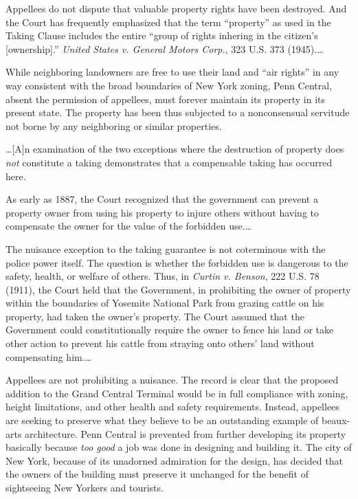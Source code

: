
Appellees do not dispute that valuable property rights have been destroyed. And
the Court has frequently emphasized that the term ``property'' as used in the
Taking Clause includes the entire ``group of rights inhering in the citizen's
[ownership].'' \textit{United States v. General Motors Corp.}, 323 U.S. 373
(1945).\ldots

While neighboring landowners are free to use their land and ``air rights'' in
any way consistent with the broad boundaries of New York zoning, Penn Central,
absent the permission of appellees, must forever maintain its property in its
present state. The property has been thus subjected to a nonconsensual servitude
not borne by any neighboring or similar properties.



\ldots [A]n examination of the two exceptions where the destruction of property
does \textit{not} constitute a taking demonstrates that a compensable taking has
occurred here.



As early as 1887, the Court recognized that the government can prevent a
property owner from using his property to injure others without having to
compensate the owner for the value of the forbidden use.\ldots

The nuisance exception to the taking guarantee is not coterminous with the
police power itself. The question is whether the forbidden use is dangerous to
the safety, health, or welfare of others. Thus, in \textit{Curtin v. Benson},
222 U.S. 78 (1911), the Court held that the Government, in prohibiting the owner
of property within the boundaries of Yosemite National Park from grazing cattle
on his property, had taken the owner's property. The Court assumed that the
Government could constitutionally require the owner to fence his land or take
other action to prevent his cattle from straying onto others' land without
compensating him.\ldots

Appellees are not prohibiting a nuisance. The record is clear that the proposed
addition to the Grand Central Terminal would be in full compliance with zoning,
height limitations, and other health and safety requirements. Instead, appellees
are seeking to preserve what they believe to be an outstanding example of
beaux-arts architecture. Penn Central is prevented from further developing its
property basically because \textit{too good} a job was done in designing and
building it. The city of New York, because of its unadorned admiration for the
design, has decided that the owners of the building must preserve it unchanged
for the benefit of sightseeing New Yorkers and tourists.

